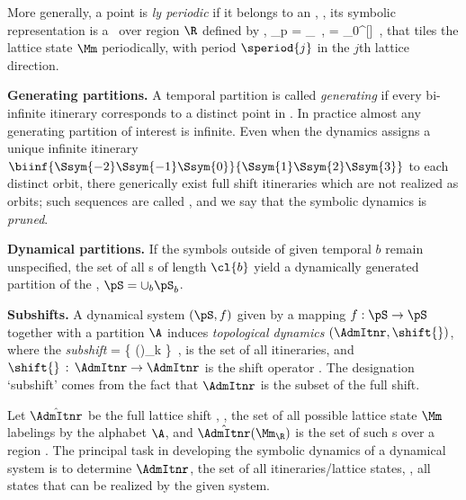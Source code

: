 More generally, a {\statesp} point is {\em {\spt}ly periodic} if
it belongs to an \dtor, \ie, its symbolic representation is a \brick\
over region $\R$ defined by ,
\beq
  \Mm_{p} = \Mm_{\R}
  \,,\qquad
  \R = \R_{0}^{[\!\times\!\!\times\cdots\times\!]}
\,,
that
tiles the lattice state  $\Mm$ periodically, with period $\speriod{j}$ in the
$j$th lattice direction.


{\bf Generating partitions.}
A temporal partition is called {\em generating} if every bi-infinite itinerary
corresponds to a distinct point in {\statesp}.
In practice almost any
generating partition of interest is infinite.
Even when the dynamics assigns a unique infinite itinerary
$\biinf{\Ssym{-2}\Ssym{-1}\Ssym{0}}{\Ssym{1}\Ssym{2} \Ssym{3}}$ to each
distinct orbit, there generically exist full shift itineraries
 which are not realized as orbits; such sequences are
called {\em \inadmissible}, and we say that the symbolic dynamics is {\em
pruned}.

{\bf Dynamical partitions.}
If the symbols outside of given temporal {\brick} $b$ remain unspecified, the
set of all {\admissible} {\brick s} of length $\cl{b}$ yield a dynamically
generated partition of the \statesp, $\pS = \cup_b \pS_b$.

{\bf Subshifts.}
A dynamical system $(\pS,f)$ given by a mapping $f : \pS \to \pS$
together with a {partition} $\A$ induces {\em topological dynamics}
$(\AdmItnr,\shift{})$, where the {\em subshift}
\beq
\AdmItnr = \{  ()_{k\in \integers} \}
\,,
is the set of all {\em \admissible} itineraries, and
$ \shift{} \,:\, \AdmItnr \to \AdmItnr $ is the shift
operator .
The designation `subshift' comes from the fact that
$\AdmItnr$  %
 is the subset of the full shift.

Let $\hat{\AdmItnr}$ be the full lattice shift  , \ie,
the set of all possible lattice state $\Mm$ labelings by the alphabet
$\A$, and $\hat{\AdmItnr}(\Mm_{\R})$ is
the set of such {\brick s} over a region {\R}. The principal task
in developing the symbolic dynamics of a dynamical system is to determine
$\AdmItnr$, the set of all \emph{{\admissible}} itineraries/lattice states,
\ie, all states that can be realized by the given system.

